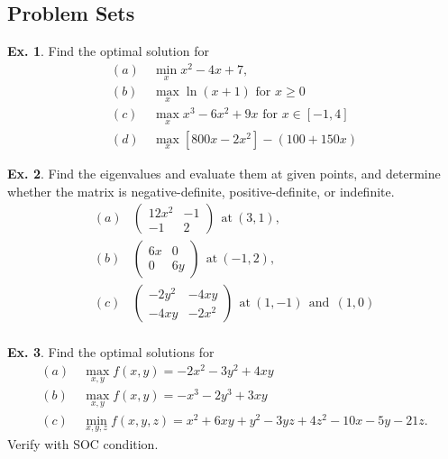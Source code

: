 \documentclass[11pt,a4paper]{book}
\theoremstyle{definition}\newtheorem{definition}{Definition}
\theoremstyle{definition}\newtheorem{fact}{Fact}
\theoremstyle{definition}\newtheorem{remark}{Remark}
\theoremstyle{definition}\newtheorem{ex}{Ex.}
\theoremstyle{definition}\newtheorem{project}{Project}
\theoremstyle{definition}\newtheorem{problem}{Problem}
\theoremstyle{definition}\newtheorem{example}{Example}
\numberwithin{theorem}{section}
\numberwithin{corollary}{chapter}
\numberwithin{assumption}{chapter}
\numberwithin{definition}{chapter}
\numberwithin{prop}{chapter}
\numberwithin{notation}{chapter}
\numberwithin{problem}{chapter}
\numberwithin{example}{chapter}
\numberwithin{fact}{chapter}
\numberwithin{ex}{chapter}
\begin{document}
	\subsection{Problem Sets}
	
	\begin{ex}
		Find the optimal solution for
		\begin{align*}
			(a) & \ \min_x x^2 - 4x + 7, \\
			(b) & \ \max_x \ln(x+1) \text{ for $x \geq 0$} \\
			(c) & \ \max_x x^3 - 6x^2 + 9x \text{ for $x \in [-1,4]$} \\
			(d) & \ \max_x [800x - 2x^2] - (100 + 150 x)
		\end{align*}
	\end{ex}
	
	\begin{ex}
		Find the eigenvalues and evaluate them at given points, and determine whether the matrix is negative-definite, positive-definite, or indefinite.
		\begin{align*}
			(a) &\begin{pmatrix}
				12 x^2 & -1   \\ -1 & 2
			\end{pmatrix} \ \ \text{at} \ (3,1), \\
			(b) &\begin{pmatrix}
				6x     & 0    \\ 0 & 6y
			\end{pmatrix} \ \ \text{at} \ (-1,2), \\
			(c) &\begin{pmatrix}
				-2y^2  & -4xy \\ -4xy & -2 x^2
			\end{pmatrix} \ \ \text{at} \ (1,-1) \ \ \text{and} \ \ (1,0) \\
		\end{align*}
	\end{ex}
	

	
	\begin{ex}
		Find the optimal solutions for
		\begin{align*}
			(a) &\ \max_{x,y} f(x,y) = -2 x^2 - 3 y^2 + 4xy \\
			(b) &\ \max_{x,y} f(x,y) = -x^3 - 2y^3 + 3xy \\
			(c) &\ \min_{x,y,z} f(x,y,z) = x^2 + 6xy + y^2 - 3yz + 4z^2 - 10x - 5y - 21z.
		\end{align*}
		Verify with SOC condition.
	\end{ex}
\end{document}
